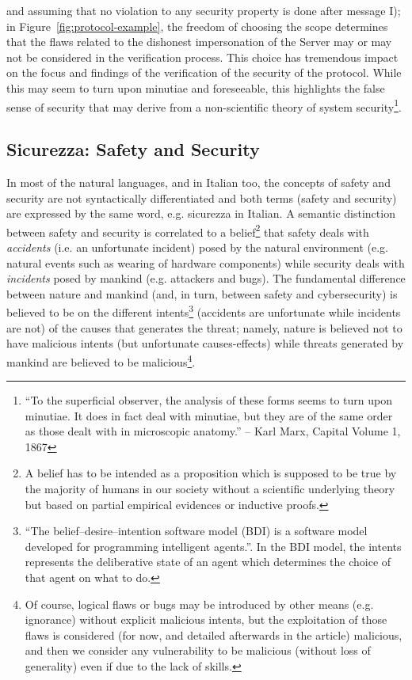 and assuming that no violation to any security property is done after message
I); in Figure~\ref{fig:protocol-example}, the freedom of choosing the scope
determines that the flaws related to the dishonest impersonation of the Server
may or may not be considered in the verification process.  This choice has
tremendous impact on the focus and findings of the verification of the security
of the protocol.  While this may seem to turn upon minutiae and foreseeable,
this highlights the false sense of security that may derive from a
non-scientific theory of system security\footnote{``To the superficial
observer, the analysis of these forms seems to turn upon minutiae. It does in
fact deal with minutiae, but they are of the same order as those dealt with in
microscopic anatomy.'' -- Karl Marx, Capital Volume 1, 1867}.

\subsection{Sicurezza: Safety and Security}\label{sec:sicurezza}
In most of the natural languages, and in Italian too, the concepts of safety
and security are not syntactically differentiated and both terms (safety and
security) are expressed by the same word, e.g. sicurezza in Italian.  A
semantic distinction between safety and security is correlated to a
belief\footnote{A belief has to be intended as a proposition which is supposed
to be true by the majority of humans in our society without a scientific
underlying theory but based on partial empirical evidences or inductive proofs.} that
safety deals with \emph{accidents} (i.e. an unfortunate incident) posed by the
natural environment (e.g. natural events such as wearing of hardware
components) while security deals with \emph{incidents} posed by mankind (e.g.
attackers and bugs).  The fundamental difference between nature and mankind (and,
in turn, between safety and cybersecurity) is believed to be on the different
intents\footnote{``The belief–desire–intention software model (BDI) is a
software model developed for programming intelligent
agents.''\autocite{wiki-bdi}. In the BDI model, the intents represents the
deliberative state of an agent which determines the choice of that agent on
what to do.} (accidents are unfortunate while incidents are not) of the causes
that generates the threat; namely, nature is believed not to have malicious
intents (but unfortunate causes-effects) while threats generated by mankind are
believed to be malicious\footnote{Of course, logical flaws or bugs may be
introduced by other means (e.g. ignorance) without explicit malicious intents,
but the exploitation of those flaws is considered (for now, and detailed
afterwards in the article) malicious, and then we consider any vulnerability to
be malicious (without loss of generality) even if due to the lack of skills.}.
